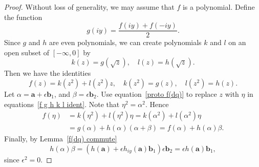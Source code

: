 \documentclass[12pt,reqno]{amsart}
\begin{document}
\begin{proof}  Without loss of generality, we may assume that $f$ is a polynomial.  Define the function
\begin{equation}
g(iy) = \frac{f(iy) + f(-iy)}2 .
\end{equation}
Since $g$ and $h$ are even polynomials, we can create polynomials $k$ and $l$ on an open subset of $[-\infty,0]$ by
\begin{equation}
k(z) = g(\sqrt z), \quad l(z) = h(\sqrt z) .
\end{equation}
Then we have the identities
\begin{equation}
\label{f g h k l ident}
f(z) = k(z^2) + l(z^2) z , \quad k(z^2) = g(z), \quad l(z^2) = h(z) .
\end{equation}
Let $\alpha = \bm a + \epsilon \bm b_1$, and $\beta = \epsilon\bm b_2$.  Use equation~\eqref{proto f(dq)} to replace $z$ with $\eta$ in equations~\eqref{f g h k l ident}.  Note that $\eta^2 = \alpha^2$.  Hence
\begin{equation}
\begin{aligned}
f(\eta)
&= k(\eta^2) + l(\eta^2) \eta = k(\alpha^2) + l(\alpha^2) \eta \\
&= g(\alpha) + h(\alpha) (\alpha + \beta) = f(\alpha) + h(\alpha) \beta.
\end{aligned}
\end{equation}
Finally, by Lemma~\ref{f(dq) commute}
\begin{equation}
h(\alpha) \beta = (h(\bm a) + \epsilon h_{iy}(\bm a) \bm b_1 ) \epsilon \bm b_2 = \epsilon h(\bm a) \bm b_1 ,
\end{equation}
since $\epsilon^2 = 0$.
\end{proof}
\end{document}
